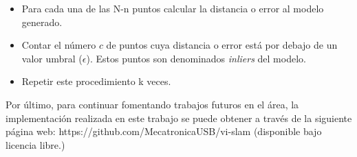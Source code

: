 \begin{itemize}
	
	
	\item  Para cada una de las N-n puntos calcular la distancia o error al modelo generado.
	\item Contar el número $c$ de puntos cuya distancia o error está por debajo de un valor umbral ($\epsilon$). Estos puntos son denominados \textit{inliers} del modelo.
	\item Repetir este procedimiento k veces.
\end{itemize}


Por último, para continuar fomentando trabajos futuros en el área, la implementación realizada en este trabajo se puede obtener a través de la siguiente página web:  https://github.com/MecatronicaUSB/vi-slam (disponible bajo licencia libre.)